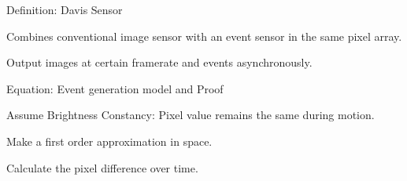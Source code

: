 \documentclass[10pt,a4paper]{scrartcl}
\begin{document}
\begin{multicols*}{2}
\begin{QandA}
{Definition: Davis Sensor}
\item Combines conventional image sensor with an event sensor in the same pixel array.
\item Output images at certain framerate and events asynchronously.
\end{QandA}

\begin{QandA}
{Equation: Event generation model and Proof}
\item Assume Brightness Constancy: Pixel value remains the same during motion.
\item Make a first order approximation in space.
\item Calculate the pixel difference over time.
\end{QandA}

\end{multicols*}
\end{document}
